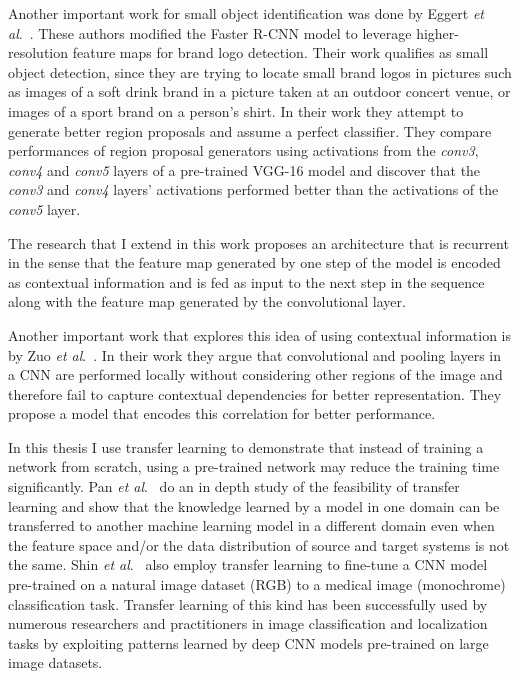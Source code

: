 \documentclass [11pt,letterpaper ,twoside ,openany ]{report}
\begin{document}
    Another important work for small object identification was done by Eggert \textit{et al}.\ \cite{eggert2017improving}. These authors modified the Faster R-CNN model \cite{ren2015faster} to leverage higher-resolution feature maps for brand logo detection. Their work qualifies as small object detection, since they are trying to locate small brand logos in pictures such as images of a soft drink brand in a picture taken at an outdoor concert venue, or images of a sport brand on a person's shirt. In their work they attempt to generate better region proposals and assume a perfect classifier. They compare performances of region proposal generators using activations from the \textit{conv3}, \textit{conv4} and \textit{conv5} layers of a pre-trained VGG-16 model and discover that the \textit{conv3} and \textit{conv4} layers' activations performed better than the activations of the \textit{conv5} layer. 

    The research that I extend \cite{Singh_2016_CVPR} in this work proposes an architecture that is recurrent in the sense that the feature map generated by one step of the model is encoded as contextual information and is fed as input to the next step in the sequence along with the feature map generated by the convolutional layer. 

    Another important work that explores this idea of using contextual information is by Zuo \textit{et al}.\ \cite{zuo2015convolutional}. In their work they argue that convolutional and pooling layers in a CNN are performed locally without considering other regions of the image and therefore fail to capture contextual dependencies for better representation. They propose a model that encodes this correlation for better performance.

    In this thesis I use transfer learning to demonstrate that instead of training a network from scratch, using a pre-trained network may reduce  the training time significantly. Pan \textit{et al}.\ \cite{pan2010survey} do an in depth study of the feasibility of transfer learning and show that the knowledge learned by a model in one domain can be transferred to another machine learning model in a different domain even when the feature space and/or the data distribution of source and target systems is not the same. Shin \textit{et al}.\ \cite{hoo2016deep} also employ transfer learning to fine-tune a CNN model pre-trained on a natural image dataset (RGB) to a medical image (monochrome) classification task. Transfer learning of this kind has been successfully used by numerous researchers and practitioners in image classification and localization tasks by exploiting patterns learned by deep CNN models pre-trained on large image datasets. 
\end{document}
